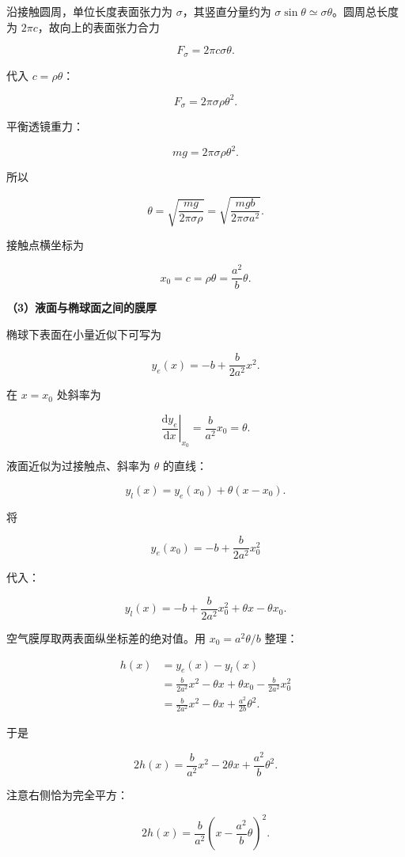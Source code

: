 \documentclass[12pt,a4paper,UTF8]{ctexart}
\begin{document}
沿接触圆周，单位长度表面张力为 \(\sigma\)，其竖直分量约为
\(\sigma\sin\theta\simeq\sigma\theta\)。圆周总长度为
\(2\pi c\)，故向上的表面张力合力

\[
F_\sigma
=2\pi c\sigma\theta.
\tag{8}
\]

代入 \(c=\rho\theta\)：

\[
F_\sigma=2\pi\sigma\rho\theta^2.
\tag{9}
\]

平衡透镜重力：

\[
mg=2\pi\sigma\rho\theta^2.
\tag{10}
\]

所以

\[
\theta
=\sqrt{\frac{mg}{2\pi\sigma\rho}}
=\sqrt{\frac{mgb}{2\pi\sigma a^2}}.
\tag{11}
\]

接触点横坐标为

\[
x_0=c=\rho\theta=\frac{a^2}{b}\theta.
\tag{12}
\]

\textbf{（3）液面与椭球面之间的膜厚}

椭球下表面在小量近似下可写为

\[
y_e(x)=-b+\frac{b}{2a^2}x^2.
\tag{13}
\]

在 \(x=x_0\) 处斜率为

\[
\left.\frac{\mathrm dy_e}{\mathrm dx}\right|_{x_0}
=\frac{b}{a^2}x_0
=\theta.
\tag{14}
\]

液面近似为过接触点、斜率为 \(\theta\) 的直线：

\[
y_l(x)
=y_e(x_0)+\theta(x-x_0).
\tag{15}
\]

将

\[
y_e(x_0)=-b+\frac{b}{2a^2}x_0^2
\]

代入：

\[
y_l(x)
=-b+\frac{b}{2a^2}x_0^2+\theta x-\theta x_0.
\tag{16}
\]

空气膜厚取两表面纵坐标差的绝对值。用 \(x_0=a^2\theta/b\) 整理：

\[
\begin{aligned}
h(x)
&=y_e(x)-y_l(x)\\
&=\frac{b}{2a^2}x^2-\theta x
+\theta x_0-\frac{b}{2a^2}x_0^2\\
&=\frac{b}{2a^2}x^2-\theta x
+\frac{a^2}{2b}\theta^2.
\end{aligned}
\tag{17}
\]

于是

\[
2h(x)
=\frac{b}{a^2}x^2-2\theta x+\frac{a^2}{b}\theta^2.
\tag{18}
\]

注意右侧恰为完全平方：

\[
2h(x)
=\frac{b}{a^2}
\left(x-\frac{a^2}{b}\theta\right)^2.
\tag{19}
\]
\end{document}
